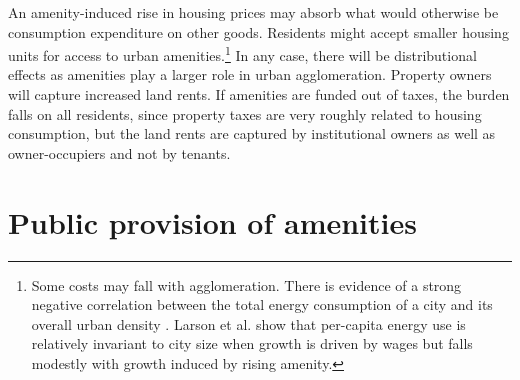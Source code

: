  


An amenity-induced rise in housing prices may absorb what would otherwise be consumption expenditure on other goods. Residents might accept smaller housing units for access to urban amenities.\footnote{Some costs may fall with agglomeration. There is evidence of a strong negative correlation between the total energy consumption of a city and its overall urban density \cite{newmanSustainabilityCitiesOvercoming1999}. Larson et al. \cite{larsonEnergyImplicationsCity2015} show that per-capita energy use is relatively invariant to city size when growth is driven by wages but falls modestly with growth induced by rising amenity.} In any case, there will be distributional effects as amenities play a larger role in urban agglomeration. Property owners will capture increased land rents. If amenities are funded out of taxes, the burden falls on all residents, since property taxes are very roughly related to housing consumption, but the land rents are captured by institutional owners as well as owner-occupiers and not by tenants.


\section{Public provision of amenities}


